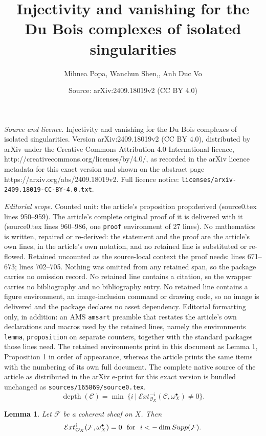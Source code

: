 \documentclass[10pt,a4paper]{amsart}
\title{Injectivity and vanishing for the Du Bois complexes of isolated singularities}
\author{Mihnea Popa, Wanchun Shen,, Anh Duc Vo}
\date{Source: arXiv:2409.18019v2 (CC BY 4.0)}
\newtheorem{lemma}{Lemma}
\newcommand{\C}{\mathcal C}
\newcommand{\E}{\mathcal E}
\newcommand{\F}{\mathcal F}
\renewcommand{\O}{\mathcal O}
\DeclareMathOperator{\depth}{depth}
\newcommand{\sExt}{\E xt} %
\begin{document}
\maketitle

\noindent\emph{Source and licence.} Injectivity and vanishing for the Du Bois complexes of isolated singularities. Version arXiv:2409.18019v2 (CC BY 4.0), distributed by arXiv under the Creative Commons Attribution 4.0 International licence, http://creativecommons.org/licenses/by/4.0/, as recorded in the arXiv licence metadata for this exact version and shown on the abstract page https://arxiv.org/abs/2409.18019v2. Full licence notice: \texttt{licenses/arxiv-2409.18019-CC-BY-4.0.txt}.\par\smallskip

\noindent\textit{Editorial scope.} Counted unit: the article's proposition prop:derived (source0.tex lines 950--959). The article's complete original proof of it is delivered with it (source0.tex lines 960--986, one \texttt{proof} environment of 27 lines). No mathematics is written, repaired or re-derived: the statement and the proof are the article's own lines, in the article's own notation, and no retained line is substituted or re-flowed.  Retained uncounted as the source-local context the proof needs: lines 671--673; lines 702--705.  Nothing was omitted from any retained span, so the package carries no omission record.  No retained line contains a citation, so the wrapper carries no bibliography and no bibliography entry.  No retained line contains a figure environment, an image-inclusion command or drawing code, so no image is delivered and the package declares no asset dependency.  Editorial formatting only, in addition: an AMS \texttt{amsart} preamble that restates the article's own declarations and macros used by the retained lines, namely the environments \texttt{lemma}, \texttt{proposition} on separate counters, together with the standard packages those lines need.  The retained environments print in this document as Lemma 1, Proposition 1 in order of appearance, whereas the article prints the same items with the numbering of its own full document.  The complete native source of the article as distributed in the arXiv e-print for this exact version is bundled unchanged as \texttt{sources/165869/source0.tex}.
\begin{equation}\label{eqn:depth}
\depth(\C) = \min~  \{i ~|~\sExt^{-i}_{\O_X} (\C,\omega_X^{\bullet})\neq 0\}.
\end{equation}

\begin{lemma}\label{lem:vanishing-of-Ext}
Let $\F$ be a coherent sheaf on $X$. Then 
\[\sExt^i_{\O_X}(\F, \omega_X^{\bullet})=0 \text{ \,\,{\rm for} \,\,} i< -\dim {\rm Supp}( \F).\]
\end{lemma}
\end{document}
